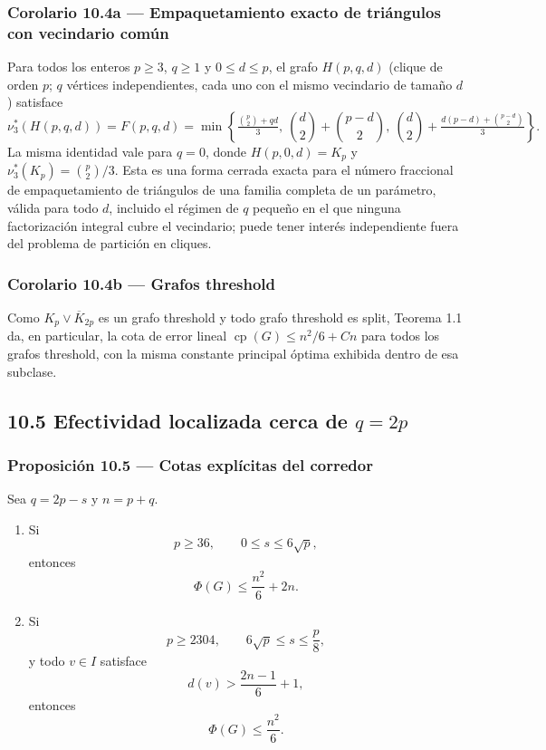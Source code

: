 \documentclass[
  11pt,
]{article}
\begin{document}
\subsubsection{Corolario 10.4a --- Empaquetamiento exacto de triángulos
con vecindario
común}\label{corolario-10.4a-empaquetamiento-exacto-de-triuxe1ngulos-con-vecindario-comuxfan}

Para todos los enteros \(p\ge3\), \(q\ge1\) y \(0\le d\le p\), el grafo
\(H(p,q,d)\) (clique de orden \(p\); \(q\) vértices independientes, cada
uno con el mismo vecindario de tamaño \(d\)) satisface \[
\nu_3^*(H(p,q,d))=F(p,q,d)=\min\left\{\tfrac{\binom p2+qd}{3},\ \binom d2+\binom{p-d}2,\ \binom d2+\tfrac{d(p-d)+\binom{p-d}2}{3}\right\}.
\] La misma identidad vale para \(q=0\), donde \(H(p,0,d)=K_p\) y
\(\nu_3^*(K_p)=\binom p2/3\). Esta es una forma cerrada exacta para el
número fraccional de empaquetamiento de triángulos de una familia
completa de un parámetro, válida para todo \(d\), incluido el régimen de
\(q\) pequeño en el que ninguna factorización integral cubre el
vecindario; puede tener interés independiente fuera del problema de
partición en cliques.

\subsubsection{Corolario 10.4b --- Grafos
threshold}\label{corolario-10.4b-grafos-threshold}

Como \(K_p\vee\overline K_{2p}\) es un grafo threshold y todo grafo
threshold es split, Teorema 1.1 da, en particular, la cota de error
lineal \(\operatorname{cp}(G)\le n^2/6+Cn\) para todos los grafos
threshold, con la misma constante principal óptima exhibida dentro de
esa subclase.

\subsection{\texorpdfstring{10.5 Efectividad localizada cerca de
\(q=2p\)}{10.5 Efectividad localizada cerca de q=2p}}\label{efectividad-localizada-cerca-de-q2p}

\subsubsection{Proposición 10.5 --- Cotas explícitas del
corredor}\label{proposiciuxf3n-10.5-cotas-expluxedcitas-del-corredor}

Sea \(q=2p-s\) y \(n=p+q\).

\begin{enumerate}
\def\labelenumi{\arabic{enumi}.}
\item
  Si \[
  p\ge36,
  \qquad
  0\le s\le6\sqrt p,
  \] entonces \[
  \boxed{
  \Phi(G)\le\frac{n^2}{6}+2n.
  }
  \tag{10.2}
  \]
\item
  Si \[
  p\ge2304,
  \qquad
  6\sqrt p\le s\le\frac p8,
  \] y todo \(v\in I\) satisface \[
  d(v)>\frac{2n-1}{6}+1,
  \] entonces \[
  \boxed{
  \Phi(G)\le\frac{n^2}{6}.
  }
  \tag{10.3}
  \]
\end{enumerate}
\end{document}
